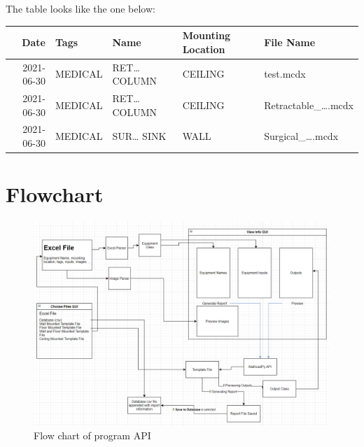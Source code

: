 \documentclass[11pt]{article}
\begin{document}
The table looks like the one below:
\begin{center}
\begin{tabular}{rllll}
\hline
Date & Tags & Name & Mounting Location & File Name\\
\hline
2021-06-30 & MEDICAL & RET\ldots{} COLUMN & CEILING & test.mcdx\\
2021-06-30 & MEDICAL & RET\ldots{} COLUMN & CEILING & Retractable\_\ldots{}.mcdx\\
2021-06-30 & MEDICAL & SUR\ldots{} SINK & WALL & Surgical\_\ldots{}.mcdx\\
\hline
\end{tabular}
\end{center}
\section{Flowchart}
\label{sec:org2688bed}
\begin{figure}[htbp]
\begin{centering}
\includegraphics[width=.9\linewidth]{./dist/documentation/component_flowchart.png}
\caption{\label{fig:1}Flow chart of program API}

\end{centering}
\end{figure}
\end{document}
